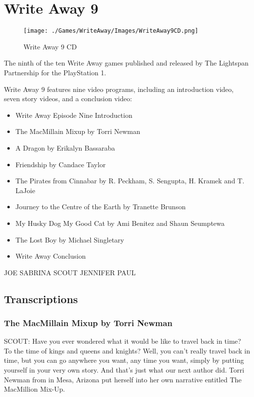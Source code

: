 \chapter{Write Away 9}

\begin{figure}[H]
    \centering
    \texttt{[image: ./Games/WriteAway/Images/WriteAway9CD.png]}
    \caption{Write Away 9 CD}
\end{figure}

The ninth of the ten Write Away games published and released by The Lightspan Partnership for the PlayStation 1.

Write Away 9 features nine video programs, including an introduction video, seven story videos, and a conclusion video:

\begin{itemize}
    \item Write Away Episode Nine Introduction
    \item The MacMillain Mixup by Torri Newman
    \item A Dragon by Erikalyn Bassaraba
    \item Friendship by Candace Taylor
    \item The Pirates from Cinnabar by R.
          Peckham, S.
          Sengupta, H.
          Kramek and T.
          LaJoie
    \item Journey to the Centre of the Earth by Tranette Brunson
    \item My Husky Dog My Good Cat by Ami Benitez and Shaun Seumptewa
    \item The Lost Boy by Michael Singletary
    \item Write Away Conclusion
\end{itemize}

\clearpage
\newpage

JOE
SABRINA
SCOUT
JENNIFER
PAUL

\section{Transcriptions}

\subsection{The MacMillain Mixup by Torri Newman}

SCOUT:
Have you ever wondered what it would be like to travel back in time?
To the time of kings and queens and knights?
Well, you can't really travel back in time, but you can go anywhere you want, any time you want, simply by putting yourself in your very own story.
And that's just what our next author did.
Torri Newman from in Mesa, Arizona put herself into her own narrative entitled The MacMillion Mix-Up.

